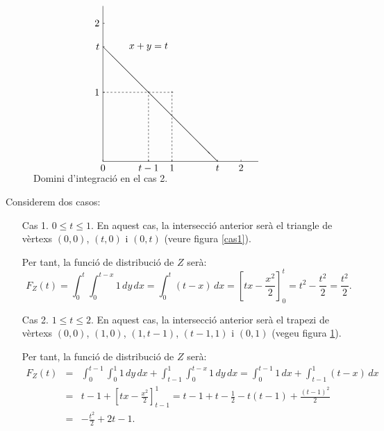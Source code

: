 {\begin{figure}
$$
\setlength{\unitlength}{2.5cm}
\begin{picture}(2.25,2.25)(0,0)
\put (0,0) {\line (1,0){2.25}}
\put (0,0) {\line (0,1){2,25}}
\put (0,-0.05) {\makebox(0,0)[t]{$0$}}
\put (1.66,-0.05) {\makebox(0,0)[t]{$t$}}
\put (0.66,-0.05) {\makebox(0,0)[t]{$t-1$}}
\put (1,-0.05) {\makebox(0,0)[t]{$1$}}
\put (2,-0.05) {\makebox(0,0)[t]{$2$}}
\put (0,0) {\line (0,1){0.025}}
\put (1.66,0) {\line (0,1){0.025}}
\put (0.66,0) {\line (0,1){0.025}}
\put (1,0) {\line (0,1){0.025}}
\put (2,0) {\line (0,1){0.025}}
\put (-0.05,1.66) {\makebox(0,0)[r]{$t$}}
\put (-0.05,1) {\makebox(0,0)[r]{$1$}}
\put (-0.05,2) {\makebox(0,0)[r]{$2$}}
\put (0,1.66) {\line(1,0){0.025}}
\put (0,1) {\line(1,0){0.025}}
\put (0,2) {\line(1,0){0.025}}
\put (0,1.66) {\line (1,-1){1.66}}
\multiput(0,1)(0.055,0){19}{\line(1,0){0.0275}}
\multiput(1,0)(0,0.055){19}{\line(0,1){0.0275}}
\multiput(0.66,0)(0,0.055){19}{\line(0,1){0.0275}}
\put (0.66,1.66) {\makebox(0,0){$x+y=t$}}
\end{picture}
$$
\caption{Domini d'integraci\'o en el cas 2.}
\label{cas2}
\end{figure}

Considerem dos casos:
\begin{itemize}
	\item[Cas 1.] $0\leq t \leq 1$. En aquest cas, la intersecci\'o  
	anterior ser\`a el triangle de v\`ertexs $(0,0)$, $(t,0)$ i $(0,t)$ (veure 
	figura \ref{cas1}).
	
	Per tant, la funci\'o de distribuci\'o de $Z$ ser\`a:
	$$
	F_Z (t)=\int_0^t\int_0^{t-x} 1\,dy\,dx =\int_0^t (t-x)\, dx={\left[t 
	x-\frac{x^2}{2}\right]}_0^t =t^2 -\frac{t^2}{2}=\frac{t^2}{2}.
	$$
	
	\item[Cas 2.] $1\leq t\leq 2$. En aquest cas, la intersecci\'o anterior
	ser\`a el trapezi de v\`ertexs $(0,0)$, $(1,0)$, $(1,t-1)$, $(t-1,1)$ i
	$(0,1)$	(vegeu figura \ref{cas2}).
	
	Per tant, la funci\'o de distribuci\'o de $Z$ ser\`a:
	\begin{eqnarray*}
		F_Z (t) & = & \int_0^{t-1}\int_0^1 1\, dy\, dx 
		+\int_{t-1}^1\int_{0}^{t-x} 1\, dy\, dx =\int_0^{t-1} 1\, 
		dx+\int_{t-1}^1 (t-x)\, dx   \\
		 & = & t-1 +{\left[ t x-\frac{x^2}{2}\right]}_{t-1}^1 = 
		 t-1+t-\frac{1}{2}- t(t-1)+\frac{{(t-1)}^2}{2}  \\
		 & = & -\frac{t^2}{2}+2 t-1.
	\end{eqnarray*}
\end{itemize}

}
